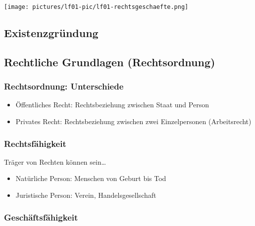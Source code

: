 \texttt{[image: pictures/lf01-pic/lf01-rechtsgeschaefte.png]} 


\subsection{Existenzgründung}


\subsection{Rechtliche Grundlagen (Rechtsordnung)}

\subsubsection{Rechtsordnung: Unterschiede}
\begin{itemize}
	\item Öffentliches Recht: Rechtsbeziehung zwischen Staat und Person
	\item Privates Recht: Rechtsbeziehung zwischen zwei Einzelpersonen (Arbeitsrecht)
\end{itemize}
	
\subsubsection{Rechtsfähigkeit}

Träger von Rechten können sein\dots

\begin{itemize}
	\item Natürliche Person: Menschen von Geburt bis Tod 
	\item Juristische Person: Verein, Handelsgesellschaft
\end{itemize}
	
\subsubsection{Geschäftsfähigkeit}

